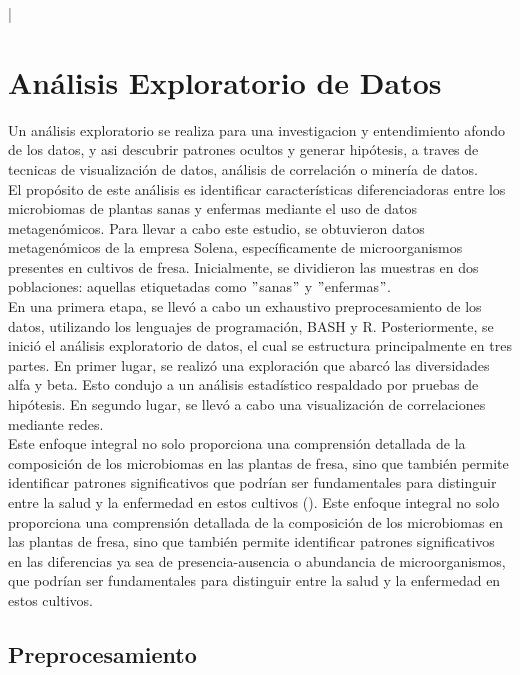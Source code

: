 |\chapter{Análisis Exploratorio de Datos}

Un análisis exploratorio se realiza para una investigacion y entendimiento afondo de los datos, y asi descubrir patrones ocultos y generar hipótesis, a traves de tecnicas de visualización de datos, análisis de correlación o minería de datos.\\

El propósito de este análisis es identificar características diferenciadoras entre los microbiomas de plantas sanas y enfermas mediante el uso de datos metagenómicos. Para llevar a cabo este estudio, se obtuvieron datos metagenómicos de la empresa Solena, específicamente de microorganismos presentes en cultivos de fresa. Inicialmente, se dividieron las muestras en dos poblaciones: aquellas etiquetadas como $"$sanas$"$ y $"$enfermas$"$.\\

En una primera etapa, se llevó a cabo un exhaustivo preprocesamiento de los datos, utilizando los lenguajes de programación, BASH y R. Posteriormente, se inició el análisis exploratorio de datos, el cual se estructura principalmente en tres partes. En primer lugar, se realizó una exploración que abarcó las diversidades alfa y beta. Esto condujo a un análisis estadístico respaldado por pruebas de hipótesis. En segundo lugar, se llevó a cabo una visualización de correlaciones mediante redes.\\ %

Este enfoque integral no solo proporciona una comprensión detallada de la composición de los microbiomas en las plantas de fresa, sino que también permite identificar patrones significativos que podrían ser fundamentales para distinguir entre la salud y la enfermedad en estos cultivos (\cite{yang2020}). 
Este enfoque integral no solo proporciona una comprensión detallada de la composición de los microbiomas en las plantas de fresa, sino que también permite identificar patrones significativos en las diferencias ya sea de presencia-ausencia o abundancia de microorganismos, que podrían ser fundamentales para distinguir entre la salud y la enfermedad en estos cultivos.

\section{Preprocesamiento}

